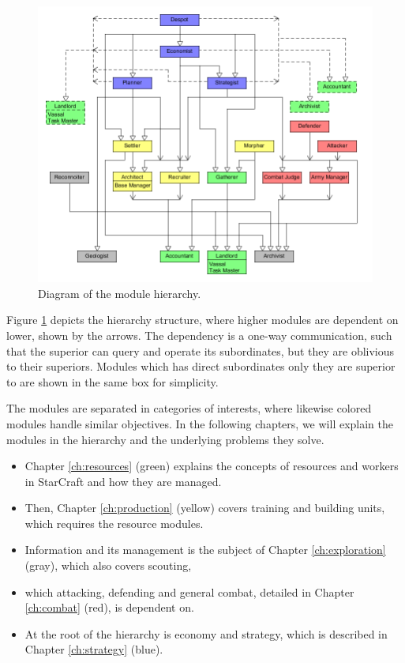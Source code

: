 \begin{figure}
	\centering
	\includegraphics[width=\textwidth]{figures/Hierarchy}
\caption{Diagram of the module hierarchy.}
\label{fig:hierarchy}
\end{figure}

Figure \ref{fig:hierarchy} depicts the hierarchy structure, where higher modules are dependent on lower, shown by the arrows. The dependency is a one-way communication, such that the superior can query and operate its subordinates, but they are oblivious to their superiors. Modules which has direct subordinates only they are superior to are shown in the same box for simplicity.

The modules are separated in categories of interests, where likewise colored modules handle similar objectives. In the following chapters, we will explain the modules in the hierarchy and the underlying problems they solve.

\begin{itemize}
	\item Chapter \ref{ch:resources} (green) explains the concepts of resources and workers in StarCraft and how they are managed.
	\item Then, Chapter \ref{ch:production} (yellow) covers training and building units, which requires the resource modules.
	\item Information and its management is the subject of Chapter \ref{ch:exploration} (gray), which also covers scouting,
	\item which attacking, defending and general combat, detailed in Chapter \ref{ch:combat} (red), is dependent on.
	\item At the root of the hierarchy is economy and strategy, which is described in Chapter \ref{ch:strategy} (blue).
\end{itemize}

